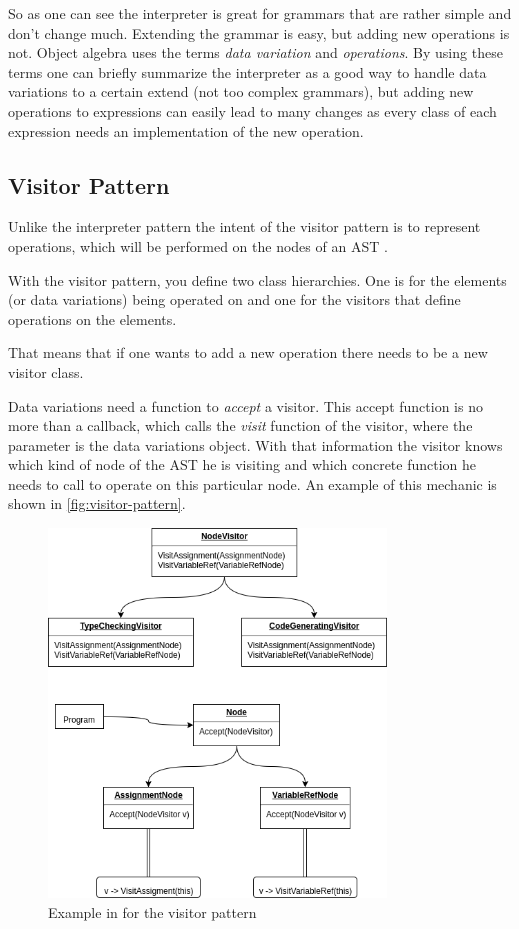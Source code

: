 \documentclass{llncs}
\begin{document}
So as one can see the interpreter is great for grammars that are rather simple and don't change much. Extending the grammar is easy, but adding new operations is not. Object algebra uses the terms \emph{data variation} and \emph{operations}. By using these terms one can briefly summarize the interpreter as a good way to handle data variations to a certain extend (not too complex grammars), but adding new operations to expressions can easily lead to many changes as every class of each expression needs an implementation of the new operation.

\subsection{Visitor Pattern} \label{ssec:visitor}
Unlike the interpreter pattern the intent of the visitor pattern is to represent operations, which will be performed on the nodes of an AST \cite{GHJV94}.

With the visitor pattern, you define two class hierarchies. One is for the elements (or data variations) being operated on and one for the visitors that define operations on the elements. \cite{GHJV94}

That means that if one wants to add a new operation there needs to be a new visitor class.

Data variations need a function to \emph{accept} a visitor. This accept function is no more than a callback, which calls the \emph{visit} function of the visitor, where the parameter is the data variations object. With that information the visitor knows which kind of node of the AST he is visiting and which concrete function he needs to call to operate on this particular node. An example of this mechanic is shown in \autoref{fig:visitor-pattern}.

\begin{figure}[h]
	\centering
	\includegraphics[width=0.8\textwidth]{img/Visitor-Pattern-Example}
	\caption{Example in \cite{GHJV94} for the visitor pattern}
	\label{fig:visitor-pattern}
\end{figure} 
\end{document}
